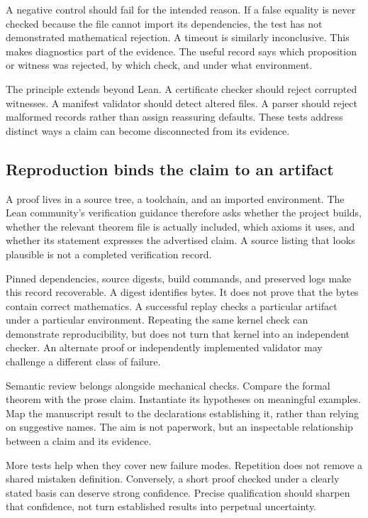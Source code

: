 A negative control should fail for the intended reason. If a false equality is never checked because the file cannot import its dependencies, the test has not demonstrated mathematical rejection. A timeout is similarly inconclusive. This makes diagnostics part of the evidence. The useful record says which proposition or witness was rejected, by which check, and under what environment.

The principle extends beyond Lean. A certificate checker should reject corrupted witnesses. A manifest validator should detect altered files. A parser should reject malformed records rather than assign reassuring defaults. These tests address distinct ways a claim can become disconnected from its evidence.

\subsection{Reproduction binds the claim to an artifact}

A proof lives in a source tree, a toolchain, and an imported environment. The Lean community's verification guidance therefore asks whether the project builds, whether the relevant theorem file is actually included, which axioms it uses, and whether its statement expresses the advertised claim. A source listing that looks plausible is not a completed verification record.

Pinned dependencies, source digests, build commands, and preserved logs make this record recoverable. A digest identifies bytes. It does not prove that the bytes contain correct mathematics. A successful replay checks a particular artifact under a particular environment. Repeating the same kernel check can demonstrate reproducibility, but does not turn that kernel into an independent checker. An alternate proof or independently implemented validator may challenge a different class of failure.

Semantic review belongs alongside mechanical checks. Compare the formal theorem with the prose claim. Instantiate its hypotheses on meaningful examples. Map the manuscript result to the declarations establishing it, rather than relying on suggestive names. The aim is not paperwork, but an inspectable relationship between a claim and its evidence.

More tests help when they cover new failure modes. Repetition does not remove a shared mistaken definition. Conversely, a short proof checked under a clearly stated basis can deserve strong confidence. Precise qualification should sharpen that confidence, not turn established results into perpetual uncertainty.


